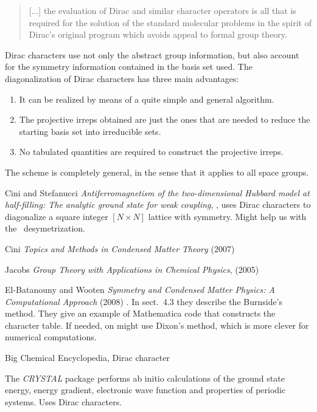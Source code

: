 \begin{description}
\begin{quote}
[...] the evaluation of Dirac and similar character operators is all that is
required for the solution of the standard molecular problems in the spirit of
Dirac's original program which avoids appeal to formal group theory.
\end{quote}

Dirac characters  use  not only  the  abstract  group  information,  but  also
account for the symmetry information contained in the basis  set  used. The
diagonalization  of  Dirac  characters has three main advantages:
\begin{enumerate}
  \item
It can be realized by means of a quite simple and
 general algorithm.
  \item
The projective irreps obtained are just  the ones that  are
 needed  to  reduce  the  starting  basis set into irreducible sets.
  \item
No tabulated  quantities  are  required  to  construct the projective irreps.
\end{enumerate}

The  scheme  is  completely  general,  in  the  sense that  it  applies  to
all  space  groups.



Cini and Stefanucci {\em Antiferromagnetism of the
two-dimensional {Hubbard} model at half-filling: {The} analytic ground state
for weak coupling}, , uses Dirac characters to
diagonalize a square integer $[N\times{N}]$ lattice with  symmetry.
Might help us with the \templatt\ desymetrization.

Cini {\em Topics and Methods in Condensed Matter Theory} (2007)

Jacobs {\em Group Theory with Applications in Chemical Physics},
(2005)

El-Batanouny and Wooten
{\em Symmetry and Condensed Matter Physics: A Computational Approach} (2008)
. In sect.~4.3 they describe the Burnside's method.
They give an example of Mathematica code that constructs
the character table.
If needed, on might use Dixon's method, which is more clever for
numerical computations.

Big Chemical Encyclopedia,
 {Dirac character}

The 
{\em CRYSTAL}  package  performs ab  initio calculations  of  the  ground
state  energy,  energy gradient, electronic wave function and properties of
periodic systems. Uses Dirac characters.


\end{description}
